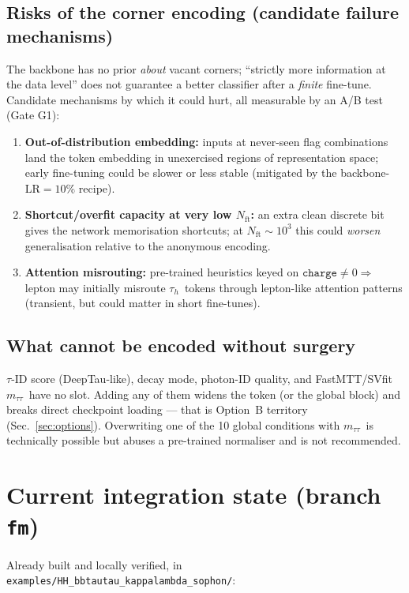 \documentclass[11pt]{article}
\newcommand{\tauh}{\ensuremath{\tau_h}}
\newcommand{\Nft}{\ensuremath{N_{\mathrm{ft}}}}
\newcommand{\mtt}{\ensuremath{m_{\tau\tau}}}
\begin{document}
\subsection{Risks of the corner encoding (candidate failure mechanisms)}
\label{sec:cornerrisks}
The backbone has no prior \emph{about} vacant corners; ``strictly more
information at the data level'' does not guarantee a better classifier after
a \emph{finite} fine-tune. Candidate mechanisms by which it could hurt,
all measurable by an A/B test (Gate G1):
\begin{enumerate}[label=(R\arabic*)]
\item \textbf{Out-of-distribution embedding:} inputs at never-seen flag
  combinations land the token embedding in unexercised regions of
  representation space; early fine-tuning could be slower or less stable
  (mitigated by the backbone-LR$=10\%$ recipe).
\item \textbf{Shortcut/overfit capacity at very low \Nft:} an extra clean
  discrete bit gives the network memorisation shortcuts; at
  $\Nft\sim10^3$ this could \emph{worsen} generalisation relative to the
  anonymous encoding.
\item \textbf{Attention misrouting:} pre-trained heuristics keyed on
  $\texttt{charge}\neq0\Rightarrow$ lepton may initially misroute \tauh\
  tokens through lepton-like attention patterns (transient, but could
  matter in short fine-tunes).
\end{enumerate}

\subsection{What cannot be encoded without surgery}
$\tau$-ID score (DeepTau-like), decay mode, photon-ID quality, and
FastMTT/SVfit \mtt\ have no slot. Adding any of them widens the token (or the
global block) and breaks direct checkpoint loading --- that is Option~B
territory (Sec.~\ref{sec:options}). Overwriting one of the 10 global
conditions with \mtt\ is technically possible but abuses a pre-trained
normaliser and is not recommended.

\section{Current integration state (branch \texttt{fm})}
\label{sec:harness}

Already built and locally verified, in
\texttt{examples/HH\_bbtautau\_kappalambda\_sophon/}:
\end{document}
